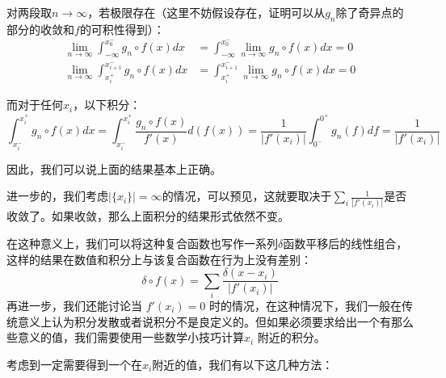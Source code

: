 \documentclass[lang=cn,10pt,newtx,bibend=biber,device=pad]{elegantbook}
\begin{document}
对两段取$n\rightarrow \infty$，若极限存在（这里不妨假设存在，证明可以从$g_n$除了奇异点的部分的收敛和$f$的可积性得到）：
\begin{align*}
\lim_{n\rightarrow\infty}\int_{-\infty}^{x^-_0} g_n\circ f(x) dx &= \int_{-\infty}^{x^-_0}\lim_{n\rightarrow\infty}g_n\circ f(x) dx = 0\\
\lim_{n\rightarrow\infty}\int_{x^+_i}^{x^-_{i+1}} g_n\circ f(x) dx &= \int_{x^+_i}^{x^-_{i+1}} \lim_{n\rightarrow\infty} g_n\circ f(x) dx = 0
\end{align*}

而对于任何$x_i$，以下积分：
\begin{equation}
\int_{x_i^-}^{x_i^+} g_n\circ f(x) dx = \int_{x_i^-}^{x_i^+} \frac{g_n\circ f(x)}{f'(x)}d(f(x))=\frac{1}{|f'(x_i)|}\int_{0^-}^{0^+} g_n(f) df = \frac{1}{|f'(x_i)|}
\end{equation}

因此，我们可以说上面的结果基本上正确。

进一步的，我们考虑$|\{x_i\}|=\infty$的情况，可以预见，这就要取决于$\sum_i\frac{1}{|f'(x_i)|}$是否收敛了。如果收敛，那么上面积分的结果形式依然不变。

在这种意义上，我们可以将这种复合函数也写作一系列$\delta$函数平移后的线性组合，这样的结果在数值和积分上与该复合函数在行为上没有差别：
\begin{equation}
\delta\circ f(x) = \sum_i \frac{\delta(x-x_i)}{|f'(x_i)|}
\end{equation}
再进一步，我们还能讨论当 $f'(x_i)=0$ 时的情况，在这种情况下，我们一般在传统意义上认为积分发散或者说积分不是良定义的。但如果必须要求给出一个有那么些意义的值，我们需要使用一些数学小技巧计算$x_i$ 附近的积分。

考虑到一定需要得到一个在$x_i$附近的值，我们有以下这几种方法：
\end{document}
